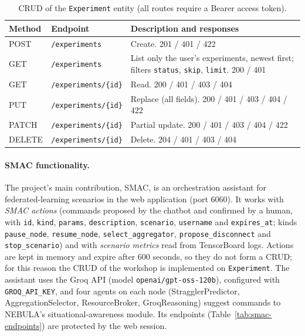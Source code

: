 \documentclass[9pt,a4paper,twocolumn]{article}
\begin{document}
\begin{table}[H]
\centering
\scriptsize
\begin{tabularx}{\columnwidth}{l l X}
\hline
\textbf{Method} & \textbf{Endpoint} & \textbf{Description and responses} \\
\hline
POST   & \texttt{/experiments}      & Create. 201 / 401 / 422 \\
GET    & \texttt{/experiments}      & List only the user's experiments, newest first; filters \texttt{status}, \texttt{skip}, \texttt{limit}. 200 / 401 \\
GET    & \texttt{/experiments/\{id\}} & Read. 200 / 401 / 403 / 404 \\
PUT    & \texttt{/experiments/\{id\}} & Replace (all fields). 200 / 401 / 403 / 404 / 422 \\
PATCH  & \texttt{/experiments/\{id\}} & Partial update. 200 / 401 / 403 / 404 / 422 \\
DELETE & \texttt{/experiments/\{id\}} & Delete. 204 / 401 / 403 / 404 \\
\hline
\end{tabularx}
\caption{CRUD of the \texttt{Experiment} entity (all routes require a Bearer access token).}
\label{tab:crud}
\end{table}

\paragraph{SMAC functionality.} The project's main contribution, SMAC, is an orchestration assistant for federated-learning scenarios in the web application (port 6060). It works with \textit{SMAC actions} (commands proposed by the chatbot and confirmed by a human, with \texttt{id}, \texttt{kind}, \texttt{params}, \texttt{description}, \texttt{scenario}, \texttt{username} and \texttt{expires\_at}; kinds \texttt{pause\_node}, \texttt{resume\_node}, \texttt{select\_aggregator}, \texttt{propose\_disconnect} and \texttt{stop\_scenario}) and with \textit{scenario metrics} read from TensorBoard logs. Actions are kept in memory and expire after 600 seconds, so they do not form a CRUD; for this reason the CRUD of the workshop is implemented on \texttt{Experiment}. The assistant uses the Groq API (model \texttt{openai/gpt-oss-120b}), configured with \texttt{GROQ\_API\_KEY}, and four agents on each node (StragglerPredictor, AggregationSelector, ResourceBroker, GroqReasoning) suggest commands to NEBULA's situational-awareness module. Its endpoints (Table~\ref{tab:smac-endpoints}) are protected by the web session.
\end{document}
